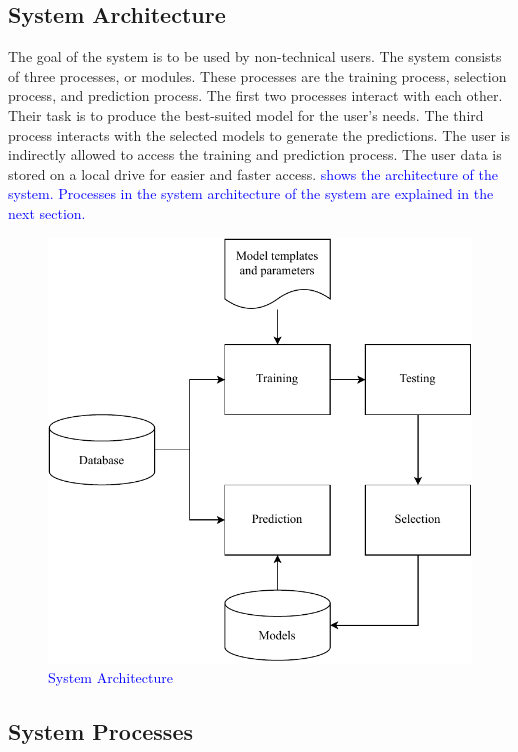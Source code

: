 \documentclass[a4paper,fleqn]{cas-dc}
\newcommand{\responsemodsm}[1]{\textcolor{blue}{#1}}
\newcommand{\captionb}[1]{\caption{\responsemodsm{#1}}}
\begin{document}
\subsection{System Architecture}\label{subsec:system_architecture}

The goal of the system is to be used by non-technical users. The system consists of three processes, or modules. These processes are the training process, selection process, and prediction process. The first two processes interact with each other. Their task is to produce the best-suited model for the user's needs. The third process interacts with the selected models to generate the predictions. The user is indirectly allowed to access the training and prediction process. The user data is stored on a local drive for easier and faster access. \responsemodsm{ shows the architecture of the system. Processes in the system architecture of the system are explained in the next section.}

\begin{figure}[ht]
    \centering
    \includegraphics[width=0.9\columnwidth]{system_architecture.pdf}
    \captionb{System Architecture}
    \label{fig:system_architecture}
\end{figure}

\subsection{System Processes}\label{subsec:system_processes}
\end{document}
